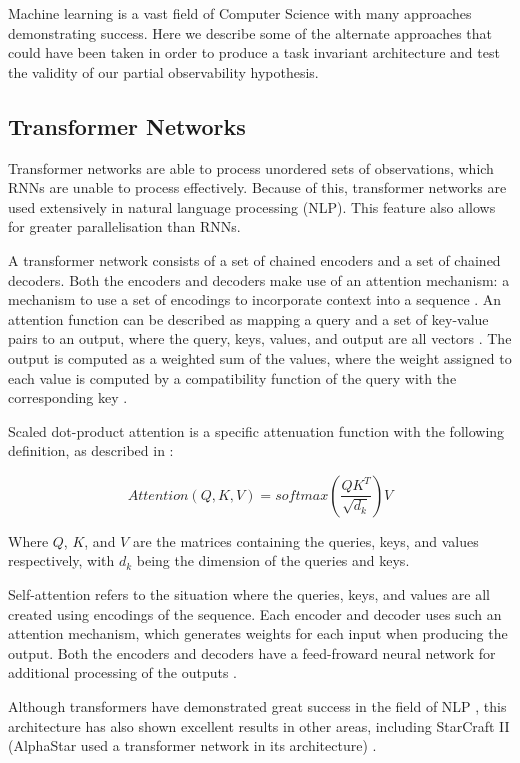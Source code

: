Machine learning is a vast field of Computer Science with many approaches demonstrating success. Here we describe some of the alternate approaches that could have been taken in order to produce a task invariant architecture and test the validity of our partial observability hypothesis.

\subsection{Transformer Networks}

Transformer networks are able to process unordered sets of observations, which RNNs are unable to process effectively. Because of this, transformer networks are used extensively in natural language processing (NLP). This feature also allows for greater parallelisation than RNNs.

A transformer network consists of a set of chained encoders and a set of chained decoders. Both the encoders and decoders make use of an attention mechanism: a mechanism to use a set of encodings to incorporate context into a sequence \cite{illustratedtransformer}. An attention function can be described as mapping a query and a set of key-value pairs to an output, where the query, keys, values, and output are all vectors \cite{attention}. The output is computed as a weighted sum of the values, where the weight assigned to each value is computed by a compatibility function of the query with the corresponding key \cite{attention}.

Scaled dot-product attention is a specific attenuation function with the following definition, as described in \cite{attention}:

\[
Attention(Q,K,V)=softmax(\frac{QK^T}{\sqrt{d_k}})V
\]

Where $Q$, $K$, and $V$ are the matrices containing the queries, keys, and values respectively, with $d_k$ being the dimension of the queries and keys.

Self-attention refers to the situation where the queries, keys, and values are all created using encodings of the sequence. Each encoder and decoder uses such an attention mechanism, which generates weights for each input when producing the output. Both the encoders and decoders have a feed-froward neural network for additional processing of the outputs \cite{illustratedtransformer}.

Although transformers have demonstrated great success in the field of NLP \cite{attention}, this architecture has also shown excellent results in other areas, including StarCraft II (AlphaStar used a transformer network in its architecture) \cite{alphastar}.

